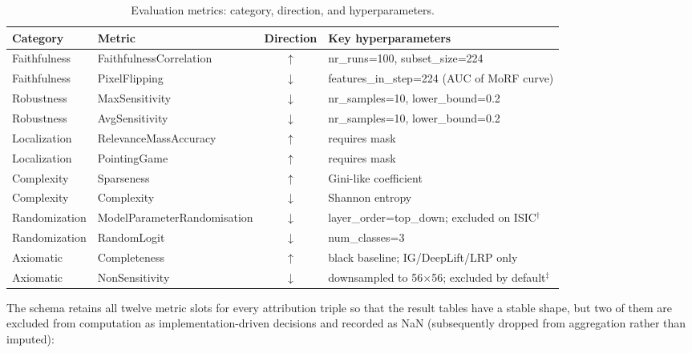\begin{table}[H]
\centering
\caption{Evaluation metrics: category, direction, and hyperparameters.}
\begin{tabularx}{\linewidth}{llcX}
\toprule
Category & Metric & Direction & Key hyperparameters \\
\midrule
Faithfulness & FaithfulnessCorrelation & $\uparrow$ & nr\_runs=100, subset\_size=224 \\
Faithfulness & PixelFlipping           & $\downarrow$ & features\_in\_step=224 (AUC of MoRF curve) \\
Robustness   & MaxSensitivity          & $\downarrow$ & nr\_samples=10, lower\_bound=0.2 \\
Robustness   & AvgSensitivity          & $\downarrow$ & nr\_samples=10, lower\_bound=0.2 \\
Localization & RelevanceMassAccuracy   & $\uparrow$ & requires mask \\
Localization & PointingGame            & $\uparrow$ & requires mask \\
Complexity   & Sparseness              & $\uparrow$ & Gini-like coefficient \\
Complexity   & Complexity              & $\downarrow$ & Shannon entropy \\
Randomization & ModelParameterRandomisation & $\downarrow$ & layer\_order=top\_down; excluded on ISIC$^{\dagger}$ \\
Randomization & RandomLogit            & $\downarrow$ & num\_classes=3 \\
Axiomatic    & Completeness            & $\uparrow$ & black baseline; IG/DeepLift/LRP only \\
Axiomatic    & NonSensitivity          & $\downarrow$ & downsampled to 56$\times$56; excluded by default$^{\ddagger}$ \\
\bottomrule
\end{tabularx}
\label{tab:metrics}
\end{table}

\noindent
The schema retains all twelve metric slots for every attribution triple so
that the result tables have a stable shape, but two of them are excluded
from computation as implementation-driven decisions and recorded as NaN
(subsequently dropped from aggregation rather than imputed):

